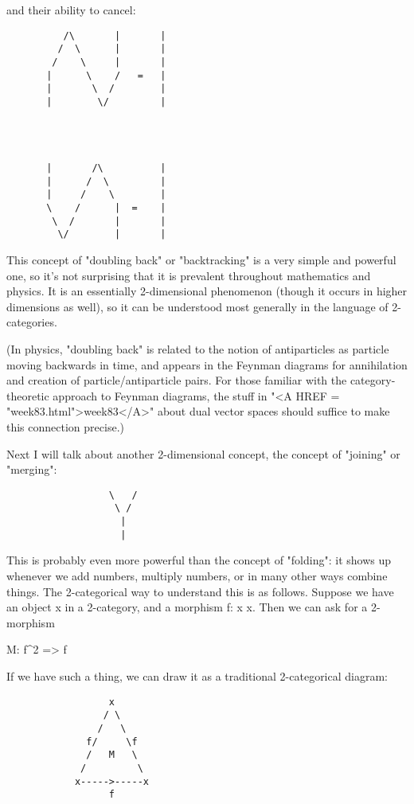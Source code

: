 and their ability to cancel:

\begin{verbatim}
          /\       |       |   
         /  \      |       |
        /    \     |       |
       |      \    /   =   |
       |       \  /        |
       |        \/         |




       |       /\          |
       |      /  \         |
       |     /    \        |
       \    /      |  =    |
        \  /       |       |
         \/        |       |

\end{verbatim}
    
This concept of "doubling back" or "backtracking" is a
very simple and powerful one, so it's not surprising that it 
is prevalent throughout mathematics and physics.  It is an
essentially 2-dimensional phenomenon (though it occurs in higher
dimensions as well), so it can be understood most generally in the 
language of 2-categories.  

(In physics, "doubling back" is related to the notion of antiparticles
as particle moving backwards in time, and appears in the Feynman diagrams
for annihilation and creation of particle/antiparticle pairs.  For
those familiar with the category-theoretic approach to Feynman diagrams, 
the stuff in "<A HREF = "week83.html">week83</A>" about dual vector spaces should suffice to make 
this connection precise.)  

Next I will talk about another 2-dimensional concept, the concept
of "joining" or "merging":

\begin{verbatim}
                  \   /
                   \ /
                    |
                    |

\end{verbatim}
    
This is probably even more powerful than the concept of "folding":
it shows up whenever we add numbers, multiply numbers, or in many
other ways combine things.  The 2-categorical way to understand
this is as follows.  Suppose we have an object x in a 2-category,
and a morphism f: x \to  x.   Then we can ask for a 2-morphism 

                M: f^{2} => f

If we have such a thing, we can draw it as a traditional 2-categorical
diagram:
\begin{verbatim}
                  x
                 / \
                /   \ 
              f/     \f
              /   M   \
             /         \
            x----->-----x
                  f

\end{verbatim}
    
